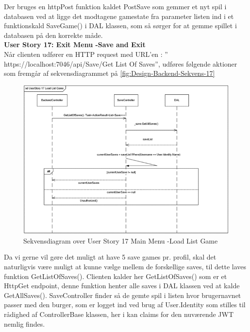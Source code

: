 Der bruges en httpPost funktion kaldet PostSave som gemmer et nyt spil i databasen ved at ligge det modtagene gamestate fra parameter listen ind i et funktionskald SaveGame() i DAL klassen, som så sørger for at gemme spillet i databasen på den korrekte måde.\\

\textbf{User Story 17: Exit Menu -\g Save and Exit}\\

Når clienten udfører en HTTP request med URL’en : ” https://localhost:7046/api/Save/Get List Of Saves”, udføres følgende aktioner som fremgår af sekvensdiagrammet på \autoref{fig:Design-Backend-Sekvens-17}\\

\begin{figure}[H]
\centering
\includegraphics[width = \textwidth]{02-Body/Images/Backend_sekvens_17.PNG}
\caption{Sekvensdiagram over User Story 17 Main Menu -\g Load List Game}
\label{fig:Design-Backend-Sekvens-17}
\end{figure}

Da vi gerne vil gøre det muligt at have 5 save games pr. profil, skal det naturligvis være muligt at kunne vælge mellem de forskellige saves, til dette laves funktion GetListOfSaves(). Clienten kalder her GetListOfSaves() som er et HttpGet endpoint, denne funktion henter alle saves i DAL klassen ved at kalde GetAllSaves(). SaveController finder så de gemte spil i listen hvor brugernavnet passer med den burger, som er logget ind ved brug af User.Identity som stilles til rådighed af ControllerBase klassen, her i kan claims for den nuværende JWT nemlig findes.\\

